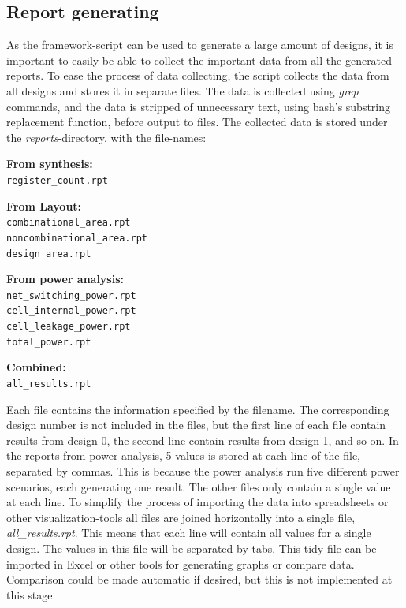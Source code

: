 \subsection{Report generating}
As the framework-script can be used to generate a large amount of designs, it is important to easily be able to collect the important data from all the generated reports. To ease the process of data collecting, the script collects the data from all designs and stores it in separate files. The data is collected using \textit{grep} commands, and the data is stripped of unnecessary text, using bash's substring replacement function, before output to files. The collected data is stored under the \textit{reports}-directory, with the file-names:
\begin{multicols}{2}
\textbf{From synthesis:}\\
\verb!register_count.rpt!

\textbf{From Layout:}\\
\verb!combinational_area.rpt!\\
\verb!noncombinational_area.rpt!\\
\verb!design_area.rpt!

\textbf{From power analysis:}\\
\verb!net_switching_power.rpt!\\
\verb!cell_internal_power.rpt!\\
\verb!cell_leakage_power.rpt!\\
\verb!total_power.rpt!

\textbf{Combined:}\\
\verb!all_results.rpt!
\end{multicols}

Each file contains the information specified by the filename. The corresponding design number is not included in the files, but the first line of each file contain results from design 0, the second line contain results from design 1, and so on. In the reports from power analysis, 5 values is stored at each line of the file, separated by commas. This is because the power analysis run five different power scenarios, each generating one result. The other files only contain a single value at each line. To simplify the process of importing the data into spreadsheets or other visualization-tools all files are joined horizontally into a single file, \textit{all\_results.rpt}. This means that each line will contain all values for a single design. The values in this file will be separated by tabs. This tidy file can be imported in Excel or other tools for generating graphs or compare data. Comparison could be made automatic if desired, but this is not implemented at this stage.

